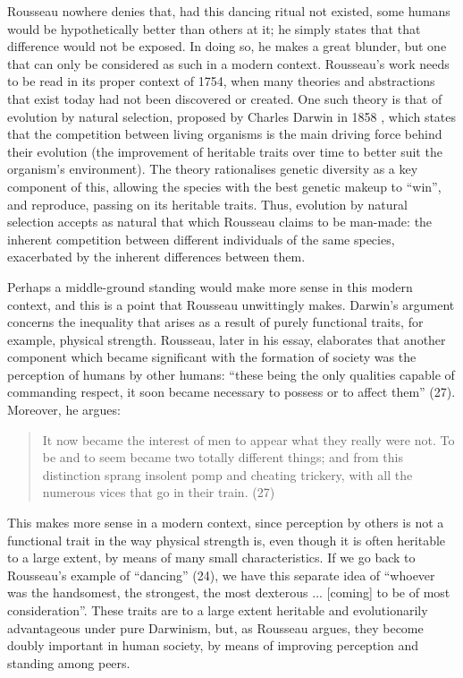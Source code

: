 Rousseau nowhere denies that, had this dancing ritual not existed, some humans would be hypothetically better than others at it; he simply states that that difference would not be exposed. In doing so, he makes a great blunder, but one that can only be considered as such in a modern context. Rousseau's work needs to be read in its proper context of 1754, when many theories and abstractions that exist today had not been discovered or created. One such theory is that of evolution by natural selection, proposed by Charles Darwin in 1858 \cite{darwin}, which states that the competition between living organisms is the main driving force behind their evolution (the improvement of heritable traits over time to better suit the organism's environment). The theory rationalises genetic diversity as a key component of this, allowing the species with the best genetic makeup to ``win'', and reproduce, passing on its heritable traits. Thus, evolution by natural selection accepts as natural that which Rousseau claims to be man-made: the inherent competition between different individuals of the same species, exacerbated by the inherent differences between them.

Perhaps a middle-ground standing would make more sense in this modern context, and this is a point that Rousseau unwittingly makes. Darwin's argument concerns the inequality that arises as a result of purely functional traits, for example, physical strength. Rousseau, later in his essay, elaborates that another component which became significant with the formation of society was the perception of humans by other humans: ``these being the only qualities capable of commanding respect, it soon became necessary to possess or to affect them'' (27). Moreover, he argues:

\begin{quote}
  It now became the interest of men to appear what they really were not. To be and to seem became two totally different things; and from this distinction sprang insolent pomp and cheating trickery, with all the numerous vices that go in their train. (27)
\end{quote}

This makes more sense in a modern context, since perception by others is not a functional trait in the way physical strength is, even though it is often heritable to a large extent, by means of many small characteristics. If we go back to Rousseau's example of ``dancing'' (24), we have this separate idea of ``whoever was the handsomest, the strongest, the most dexterous ... [coming] to be of most consideration''. These traits are to a large extent heritable and evolutionarily advantageous under pure Darwinism, but, as Rousseau argues, they become doubly important in human society, by means of improving perception and standing among peers.

